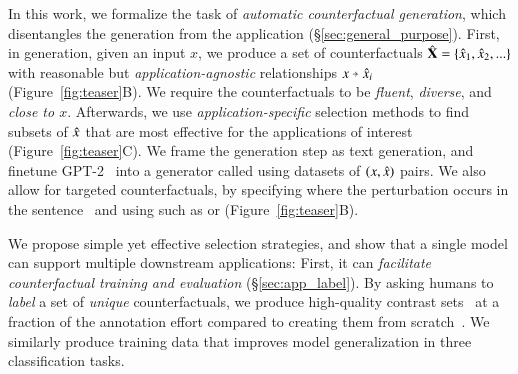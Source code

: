 In this work, we formalize the task of \emph{automatic counterfactual generation}, which disentangles the generation from the application (\S\ref{sec:general_purpose}).
First, in generation, given an input $x$, we produce a set of counterfactuals $\hat{\mathbf{X}} = \{\hat{x}_1, \hat{x}_2, ...\}$ with reasonable but \emph{application-agnostic} relationships $x \veryshortarrow \xp_i$ (Figure~\ref{fig:teaser}B).
We require the counterfactuals to be \emph{fluent}, \emph{diverse}, and \emph{close to $x$}.
Afterwards, we use \emph{application-specific} selection methods to find subsets of $\hat{x}$ that are most effective for the applications of interest (Figure~\ref{fig:teaser}C).
We frame the generation step as text generation, and finetune GPT-2~\cite{radford2019language} into a generator called \emph{\sysname} using datasets of $(x, \hat{x})$ pairs. 
We also allow for targeted counterfactuals, by specifying where the perturbation occurs in the sentence~\cite{donahue2020enabling} and using \tagstrs such as  or  (Figure~\ref{fig:teaser}B). 

We propose simple yet effective selection strategies, and show that a single \sysname model can support multiple downstream applications:
First, it can \emph{facilitate counterfactual training and evaluation} (\S\ref{sec:app_label}). 
By asking humans to \emph{label} a set of \emph{unique} counterfactuals, we produce high-quality contrast sets~\cite{gardner2020contrast} at a fraction of the annotation effort compared to creating them from scratch~\cite{kaushik2019learning}.
We similarly produce training data that improves model generalization in three classification tasks. %

